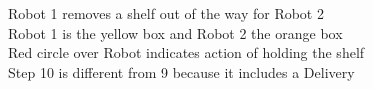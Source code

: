 \documentclass{IEEEtran}
\begin{document}
\begin{figure}[h!]
  ~~%
  \\%
  ~~%
  ~~%
  \caption{
    Robot 1 removes a shelf out of the way for Robot 2\\
    Robot 1 is the yellow box and Robot 2 the orange box\\
    Red circle over Robot indicates action of holding the shelf\\
    Step 10 is different from 9 because it includes a Delivery
  }%
  \label{fig:robotRemovesForAnother}%
\end{figure}
\end{document}
